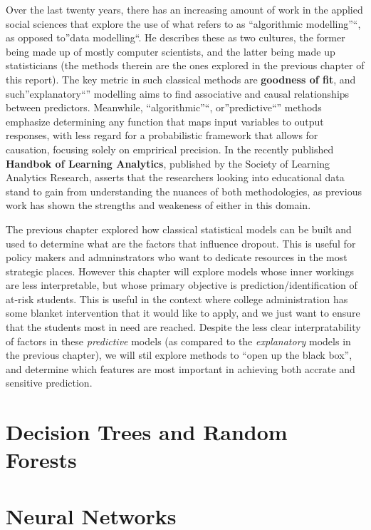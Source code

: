 \documentclass[]{book}
\theoremstyle{definition}
\theoremstyle{definition}
\theoremstyle{remark}
\begin{document}
Over the last twenty years, there has an increasing amount of work in
the applied social sciences that explore the use of what
\citep{breiman2001twocultures} refers to as ``algorithmic modelling''``,
as opposed to''data modelling``. He describes these as two cultures, the
former being made up of mostly computer scientists, and the latter being
made up statisticians (the methods therein are the ones explored in the
previous chapter of this report). The key metric in such classical
methods are \textbf{goodness of fit}, and such''explanatory``''
modelling aims to find associative and causal relationships between
predictors. Meanwhile, ``algorithmic''``, or''predictive``'' methods
emphasize determining any function that maps input variables to output
responses, with less regard for a probabilistic framework that allows
for causation, focusing solely on emprirical
precision\citep{shmueli2010explain}. In the recently published
\textbf{Handbok of Learning Analytics}\citep{hla2017}, published by the
Society of Learning Analytics Research, \citep{bergner_measurement_2017}
asserts that the researchers looking into educational data stand to gain
from understanding the nuances of both methodologies, as previous work
has shown the strengths and weakeness of either in this domain.

The previous chapter explored how classical statistical models can be
built and used to determine what are the factors that influence dropout.
This is useful for policy makers and admninstrators who want to dedicate
resources in the most strategic places. However this chapter will
explore models whose inner workings are less interpretable, but whose
primary objective is prediction/identification of at-risk students. This
is useful in the context where college administration has some blanket
intervention that it would like to apply, and we just want to ensure
that the students most in need are reached. Despite the less clear
interpratability of factors in these \emph{predictive} models (as
compared to the \emph{explanatory} models in the previous chapter), we
will stil explore methods to ``open up the black box'', and determine
which features are most important in achieving both accrate and
sensitive prediction.

\section{Decision Trees and Random
Forests}\label{decision-trees-and-random-forests}

\section{Neural Networks}\label{neural-networks}
\end{document}
